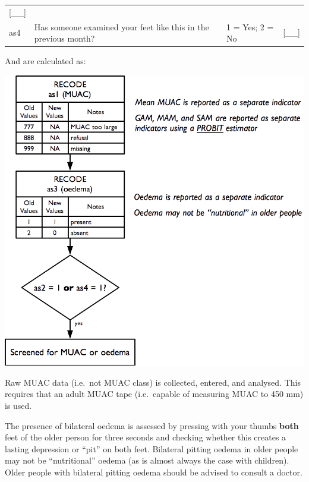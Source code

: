 \documentclass[12pt,a4paper]{book}
\theoremstyle{definition}
\theoremstyle{definition}
\theoremstyle{definition}
\theoremstyle{remark}
\begin{document}
\begin{longtable}[]{@{}llll@{}}
\begin{minipage}[t]{0.13\columnwidth}
{[}\_\_{]}\strut
\end{minipage}\tabularnewline
\begin{minipage}[t]{0.09\columnwidth}\raggedright
as4\strut
\end{minipage} & \begin{minipage}[t]{0.41\columnwidth}\raggedright
Has someone examined your feet like this in the previous month?\strut
\end{minipage} & \begin{minipage}[t]{0.25\columnwidth}\raggedright
1 = Yes; 2 = No\strut
\end{minipage} & \begin{minipage}[t]{0.13\columnwidth}\raggedright
{[}\_\_{]}\strut
\end{minipage}\tabularnewline
\bottomrule
\end{longtable}

And are calculated as:

\begin{center}\includegraphics[width=800pt]{figures/indicators25} \end{center}

Raw MUAC data (i.e.~not MUAC class) is collected, entered, and analysed.
This requires that an adult MUAC tape (i.e.~capable of measuring MUAC to
450 mm) is used.

The presence of bilateral oedema is assessed by pressing with your
thumbs \textbf{both} feet of the older person for three seconds and
checking whether this creates a lasting depression or ``pit'' on both
feet. Bilateral pitting oedema in older people may not be
``nutritional'' oedema (as is almost always the case with children).
Older people with bilateral pitting oedema should be advised to consult
a doctor.
\end{document}
